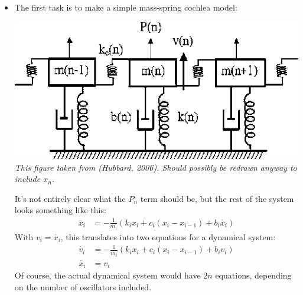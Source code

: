 

\begin{itemize}
\item The first task is to make a simple mass-spring cochlea model:
	\begin{center}
		\includegraphics[width=0.4\linewidth]{mass-spring} \\
		\textit{\footnotesize This figure taken from (Hubbard, 2006). Should possibly be redrawn anyway to include $x_n$.}
	\end{center}
It's not entirely clear what the $P_n$ term should be, but the rest of the system looks something like this:
\begin{align*}
	\ddot{x_i} &= - \frac{1}{m_i} \left( k_i x_i + c_i (x_i-x_{i-1}) + b_i \dot{x_i} \right)
\end{align*}
With $v_i=\dot{x_i}$, this translates into two equations for a dynamical system:
\begin{align*}
	\dot{v_i} &= - \frac{1}{m_i} \left( k_i x_i + c_i (x_i-x_{i-1}) + b_i v_i \right) \\
	\dot{x_i} &= v_i
\end{align*}
Of course, the actual dynamical system would have $2n$ equations, depending on the number
of oscillators included.
\end{itemize}


